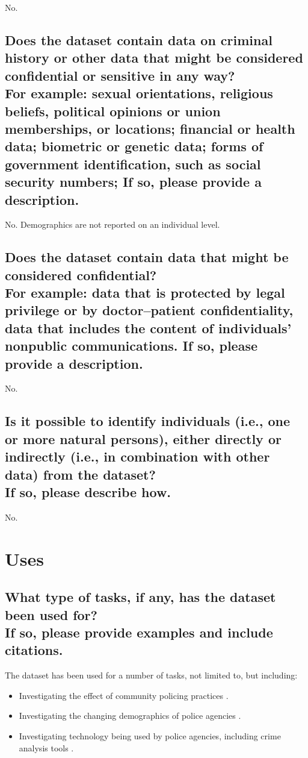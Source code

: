 \documentclass[letterpaper, 10 pt, conference]{ieeeconf}  %
\newcommand{\subtitle}[1]{{\\ \small \normalfont \color{purple} #1}}
\begin{document}
No.

\subsection{Does the dataset contain data on criminal history or other data that might be considered confidential or sensitive in any way? \subtitle{For example: sexual orientations, religious beliefs, political opinions or union memberships, or locations; financial or health data; biometric or genetic data; forms of government identification, such as social security numbers; If so, please provide a description.}}

No. Demographics are not reported on an individual level. 

\subsection{Does the dataset contain data that might be considered confidential? \subtitle{For example: data that is protected by legal privilege or by doctor–patient confidentiality, data that includes the content of individuals’ nonpublic communications. If so, please provide a description.}}

No.

\subsection{Is it possible to identify individuals (i.e., one or more natural persons), either directly or indirectly (i.e., in combination with other data) from the dataset? \subtitle{If so, please describe how.}}

No.

\section{Uses}

\subsection{What type of tasks, if any, has the dataset been used for? \subtitle{If so, please provide examples and include citations.}}

The dataset has been used for a number of tasks, not limited to, but including:

\begin{itemize}
    \item Investigating the effect of community policing practices \cite{diehr2018lack, hickman2001community, sozer2013impact}.
    \item Investigating the changing demographics of police agencies \cite{sklansky2005not, yu2022women}.
    \item Investigating technology being used by police agencies, including crime analysis tools \cite{weisburd2005diffusion, hyland2018body, reaves2015local}.
\end{itemize}
\end{document}
